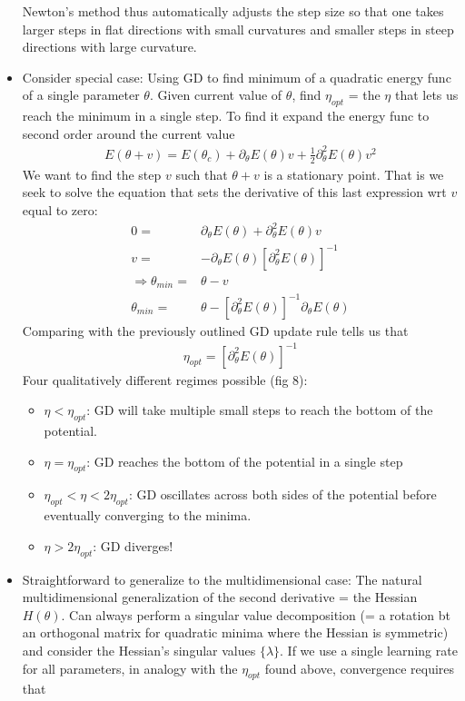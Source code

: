 \documentclass[norsk,a4paper,11pt]{article}
\begin{document}
\begin{itemize}
		Newton's method thus automatically adjusts the step size so that one takes larger steps in flat directions with small curvatures and smaller steps in steep directions with large curvature.
		\item Consider special case: Using GD to find minimum of a quadratic energy func of a single parameter $\theta$. Given current value of $\theta$, find $\eta_{opt}$ = the $\eta$ that lets us reach the minimum in a single step. To find it expand the energy func to second order around the current value
		\begin{align}
			E(\theta + v) = E(\theta_c) + \partial_\theta E(\theta) v 
			+ \frac{1}{2} \partial_\theta^2 E(\theta) v^2
		\end{align}
		We want to find the step $v$ such that $\theta + v$ is a stationary point. That is we seek to solve the equation that sets the derivative of this last expression wrt $v$ equal to zero:
		\begin{align}
			0 =& \partial_\theta E(\theta) + \partial_\theta^2 E(\theta) v \\
			v =& - \partial_\theta E(\theta) [\partial_\theta^2 E(\theta)]^{-1} \\
			\Rightarrow \theta_{min} =& \theta - v \\
			\theta_{min} =& \theta - [\partial_\theta^2 E(\theta)]^{-1} \partial_\theta E(\theta) 
		\end{align}
		Comparing with the previously outlined GD update rule tells us that
		\begin{align}
			\eta_{opt} = [\partial_\theta^2 E(\theta)]^{-1} 
		\end{align}
		Four qualitatively different regimes possible (fig 8):
		\begin{itemize}
			\item $\eta < \eta_{opt}$: GD will take multiple small steps to reach the bottom of the potential.
			\item $\eta = \eta_{opt}$: GD reaches the bottom of the potential in a single step
			\item $\eta_{opt} < \eta < 2\eta_{opt}$: GD oscillates across both sides of the potential before eventually converging to the minima.
			\item $\eta > 2\eta_{opt}$: GD diverges!
		\end{itemize}
		\item Straightforward to generalize to the multidimensional case: The natural multidimensional generalization of the second derivative = the Hessian $H(\theta)$. Can always perform a singular value decomposition (= a rotation bt an orthogonal matrix for quadratic minima where the Hessian is symmetric) and consider the Hessian's singular values $\{ \lambda \}$. If we use a single learning rate for all parameters, in analogy with the $\eta_{opt}$ found above, convergence requires that

\end{itemize}
\end{document}
